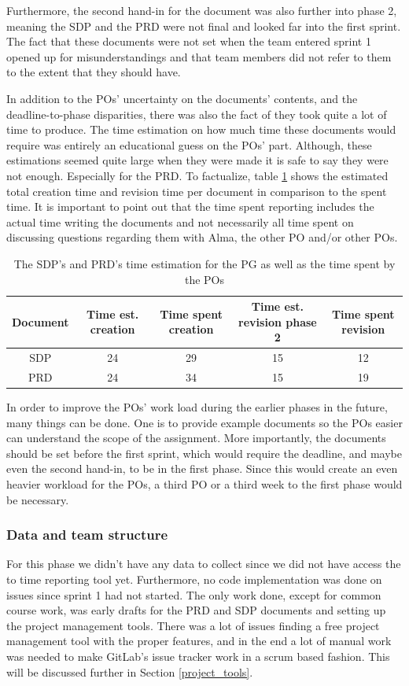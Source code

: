 \documentclass{article}
\begin{document}
Furthermore, the second hand-in for the document was also further into phase 2, meaning the SDP and the PRD were not final and looked far into the first sprint. The fact that these documents were not set when the team entered sprint 1 opened up for misunderstandings and that team members did not refer to them to the extent that they should have. 

In addition to the POs' uncertainty on the documents' contents, and the deadline-to-phase disparities, there was also the fact of they took quite a lot of time to produce. The time estimation on how much time these documents would require was entirely an educational guess on the POs' part. Although, these estimations seemed quite large when they were made it is safe to say they were not enough. Especially for the PRD. To factualize, table \ref{tab:timeDocs} shows the estimated total creation time and revision time per document in comparison to the spent time. It is important to point out that the time spent reporting includes the actual time writing the documents and not necessarily all time spent on discussing questions regarding them with Alma, the other PO and/or other POs.    
\begin{table}[h!]
    \centering
    \begin{tabular}{|c|c|c|c|c|}
    \hline
      Document & Time est. creation & Time spent creation  & Time est. revision phase 2 & Time spent revision \\
      \hline \hline
      SDP & 24 & 29 & 15 & 12 \\ \hline
      PRD & 24 & 34 & 15 & 19 \\ \hline
    \end{tabular}
    \caption{The SDP's and PRD's time estimation for the PG as well as the time spent by the POs}
    \label{tab:timeDocs}
\end{table}

In order to improve the POs' work load during the earlier phases in the future, many things can be done. One is to provide example documents so the POs easier can understand the scope of the assignment. More importantly, the documents should be set before the first sprint, which would require the deadline, and maybe even the second hand-in, to be in the first phase. Since this would create an even heavier workload for the POs, a third PO or a third week to the first phase would be necessary. 

\subsubsection{Data and team structure}
For this phase we didn't have any data to collect since we did not have access the to time reporting tool yet. Furthermore, no code implementation was done on issues since sprint 1 had not started. The only work done, except for common course work, was early drafts for the PRD and SDP documents and setting up the project management tools. There was a lot of issues finding a free project management tool with the proper features, and in the end a lot of manual work was needed to make GitLab's issue tracker work in a scrum based fashion. This will be discussed further in Section \ref{project_tools}.
\end{document}
